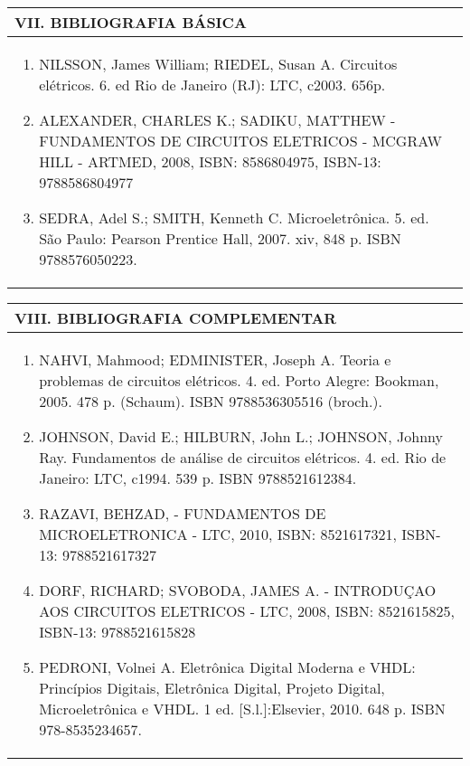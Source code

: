 \documentclass[12pt]{article}
\begin{document}
\newpage


\begin{longtable}{|L{1.025\textwidth}|} \hline
%
{\bf VII. BIBLIOGRAFIA BÁSICA} \\ \hline

\begin{enumerate}
\item NILSSON, James William; RIEDEL, Susan A. Circuitos elétricos. 6. ed Rio de Janeiro (RJ): LTC, c2003. 656p. 
\item ALEXANDER, CHARLES K.; SADIKU, MATTHEW - FUNDAMENTOS DE CIRCUITOS  ELETRICOS - MCGRAW HILL - ARTMED, 2008, ISBN: 8586804975, ISBN-13: 9788586804977 
\item SEDRA, Adel S.; SMITH, Kenneth C. Microeletrônica. 5. ed. São Paulo: Pearson Prentice Hall, 2007. xiv, 848 p. ISBN 9788576050223.
\end{enumerate}

 \\ \hline
\end{longtable}



\begin{longtable}{|L{1.025\textwidth}|} \hline
%
{\bf VIII. BIBLIOGRAFIA COMPLEMENTAR} \\ \hline
\begin{enumerate}
\item NAHVI, Mahmood; EDMINISTER, Joseph A. Teoria e problemas de circuitos elétricos. 4. ed. Porto Alegre: Bookman, 2005. 478 p. (Schaum). ISBN 9788536305516 (broch.).
\item JOHNSON, David E.; HILBURN, John L.; JOHNSON, Johnny Ray. Fundamentos de análise de circuitos elétricos. 4. ed. Rio de Janeiro: LTC, c1994. 539 p. ISBN 9788521612384.
\item RAZAVI, BEHZAD, - FUNDAMENTOS DE MICROELETRONICA - LTC, 2010, ISBN: 8521617321, ISBN-13: 9788521617327 
\item DORF, RICHARD; SVOBODA, JAMES A. - INTRODUÇAO AOS CIRCUITOS ELETRICOS - LTC, 2008, ISBN: 8521615825, ISBN-13: 9788521615828 
\item PEDRONI, Volnei A. Eletrônica Digital Moderna e VHDL: Princípios Digitais, Eletrônica Digital, Projeto Digital, Microeletrônica e VHDL. 1 ed. [S.l.]:Elsevier, 2010. 648 p. ISBN 978-8535234657.

%
\end{enumerate}
 \\ \hline
\end{longtable}



\end{document}
